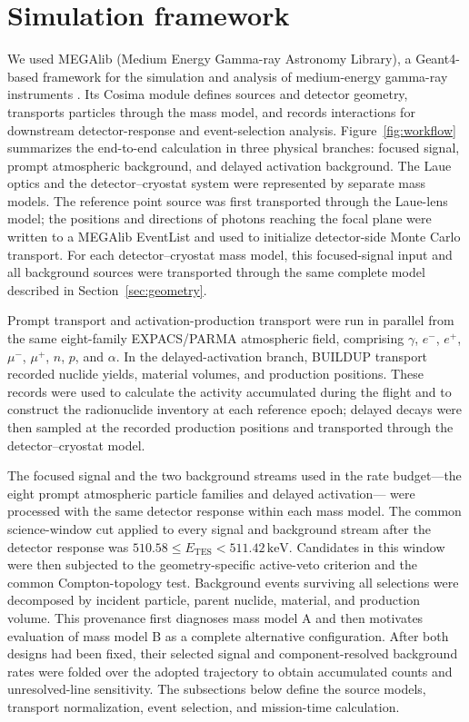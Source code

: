 \documentclass[11pt]{article}
\newcommand{\keV}{\ensuremath{\,\mathrm{keV}}}
\begin{document}
\FloatBarrier

\section{Simulation framework}
\label{sec:framework}

We used MEGAlib (Medium Energy Gamma-ray Astronomy Library), a
Geant4-based framework for the simulation and analysis of medium-energy
gamma-ray instruments \cite{Zoglauer2006,Agostinelli2003,Allison2016}. Its
Cosima module defines sources and detector geometry, transports particles
through the mass model, and records interactions for downstream detector-response
and event-selection analysis. Figure~\ref{fig:workflow} summarizes the end-to-end
calculation in three physical branches: focused signal, prompt atmospheric
background, and delayed activation background. The Laue optics and the
detector--cryostat system were represented by separate mass models. The
reference point source was first transported through the Laue-lens model; the
positions and directions of photons reaching the focal plane were written to a
MEGAlib EventList and used to initialize detector-side Monte Carlo transport.
For each detector--cryostat mass model, this focused-signal input and all
background sources were transported through the same complete model described
in Section~\ref{sec:geometry}.

Prompt transport and activation-production transport were run in parallel from
the same eight-family EXPACS/PARMA atmospheric field, comprising
$\gamma$, $e^-$, $e^+$, $\mu^-$, $\mu^+$, $n$, $p$, and $\alpha$. In
the delayed-activation branch, BUILDUP transport recorded nuclide yields,
material volumes, and production positions. These records were used to
calculate the activity accumulated during the flight and to construct the
radionuclide inventory at each reference epoch; delayed decays were then
sampled at the recorded production positions and transported through the
detector--cryostat model.

The focused signal and the two background streams used in the rate
budget---the eight prompt atmospheric particle families and delayed
activation--- were processed with the same detector response within each
mass model. The common science-window cut applied to every signal and
background stream after the detector response was
$510.58\leq E_{\mathrm{TES}}<511.42\keV$. Candidates in this window were then
subjected to the geometry-specific active-veto criterion and the common
Compton-topology test. Background events surviving all selections were
decomposed by incident particle, parent
nuclide, material, and production volume. This provenance first diagnoses mass
model A and then motivates evaluation of mass model B as a complete alternative
configuration. After both designs had been fixed, their selected signal and
component-resolved background rates were folded over the adopted trajectory to
obtain accumulated counts and unresolved-line sensitivity. The subsections
below define the source models, transport normalization, event selection, and
mission-time calculation.
\end{document}
